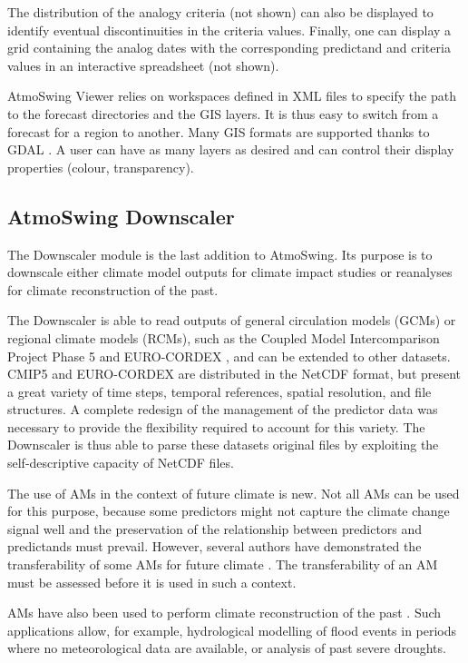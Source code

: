 \documentclass[gmdd]{copernicus}
\begin{document}
The distribution of the analogy criteria (not shown) can also be displayed to identify eventual discontinuities in the criteria values. Finally, one can display a grid containing the analog dates with the corresponding predictand and criteria values in an interactive spreadsheet (not shown). 

AtmoSwing Viewer relies on workspaces defined in XML files to specify the path to the forecast directories and the GIS layers. It is thus easy to switch from a forecast for a region to another. Many GIS formats are supported thanks to GDAL \cite[Geospatial Data Abstraction Library,][]{GDAL2014}. A user can have as many layers as desired and can control their display properties (colour, transparency).


\subsection{AtmoSwing Downscaler}
\label{sec:downscaler}

The Downscaler module is the last addition to AtmoSwing. Its purpose is to downscale either climate model outputs for climate impact studies or reanalyses for climate reconstruction of the past. 

The Downscaler is able to read outputs of general circulation models (GCMs) or regional climate models (RCMs), such as the Coupled Model Intercomparison Project Phase 5 \citep[CMIP5,][]{Taylor2012} and EURO-CORDEX \citep{Jacob2014}, and can be extended to other datasets. CMIP5 and EURO-CORDEX are distributed in the NetCDF format, but present a great variety of time steps, temporal references, spatial resolution, and file structures. A complete redesign of the management of the predictor data was necessary to provide the flexibility required to account for this variety. The Downscaler is thus able to parse these datasets original files by exploiting the self-descriptive capacity of NetCDF files. 

The use of AMs in the context of future climate is new. Not all AMs can be used for this purpose, because some predictors might not capture the climate change signal well and the preservation of the relationship between predictors and predictands must prevail. However, several authors have demonstrated the transferability of some AMs for future climate \citep{Dayon2015, Dayon2018, Raynaud2016, Turco2017}. The transferability of an AM must be assessed before it is used in such a context. 

AMs have also been used to perform climate reconstruction of the past \citep{Caillouet2016, Caillouet2017, Bonnet2017}. Such applications allow, for example, hydrological modelling of flood events in periods where no meteorological data are available, or analysis of past severe droughts. 
\end{document}

